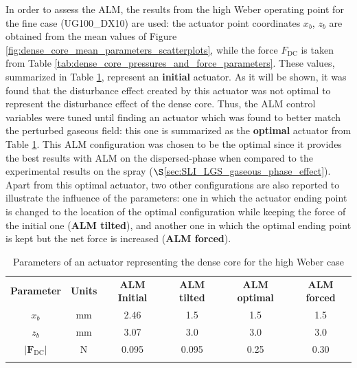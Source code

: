 In order to assess the ALM, the results from the high Weber operating point for the fine case (UG100\_DX10) are used: the actuator point coordinates $x_b$, $z_b$ are obtained from the mean values of Figure \ref{fig:dense_core_mean_parameters_scatterplots}, while the force $F_\mathrm{DC}$ is taken from Table \ref{tab:dense_core_pressures_and_force_parameters}. These values, summarized in Table \ref{tab:jicf_lgs_ALM_parameters}, represent an \textbf{initial} actuator. As it will be shown, it was found that the disturbance effect created by this actuator was not optimal to represent the disturbance effect of the dense core. Thus, the ALM control variables were tuned until finding an actuator which was found to better match the perturbed gaseous field: this one is summarized as the \textbf{optimal} actuator from Table \ref{tab:jicf_lgs_ALM_parameters}. This ALM configuration was chosen to be the optimal since it provides the best results with ALM on the dispersed-phase when compared to the experimental results on the spray ($\S$\ref{sec:SLI_LGS_gaseous_phase_effect}). Apart from this optimal actuator, two other configurations are also reported to illustrate the influence of the parameters: one in which the actuator ending point is changed to the location of the optimal configuration while keeping the force of the initial one (\textbf{ALM tilted}), and another one in which the optimal ending point is kept but the net force is increased (\textbf{ALM forced}). 


\begin{table}[!h]
\centering
\caption{Parameters of an actuator representing the dense core for the high Weber case}
\begin{tabular}{cccccc}
\thickhline
\textbf{Parameter} & \textbf{Units} &  \textbf{ALM Initial} & \textbf{ALM tilted} &  \textbf{ALM optimal} & \textbf{ALM forced} \\
\thickhline
$x_b$ & mm & 2.46 & 1.5 & 1.5 & 1.5 \\
$z_b$ & mm & 3.07 & 3.0 & 3.0 & 3.0 \\
$| \textbf{F}_\mathrm{DC} |$ & N & 0.095 & 0.095 & 0.25 & 0.30 \\
\thickhline
\end{tabular}
\label{tab:jicf_lgs_ALM_parameters}
\end{table}


